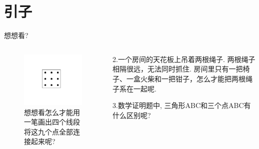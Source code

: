 \documentclass[UTF8, aspectratio=169, 10pt, t]{ctexbeamer}
\begin{document}
\section*{引子}

\begin{frame}{想想看?}
	\begin{columns}[c]
		\begin{column}{0.5\textwidth}
			\begin{figure}
				\centering
				\includegraphics[width=0.7\linewidth]{i1}
				\caption{想想看怎么才能用一笔画出四个线段将这九个点全部连接起来呢?}
				\label{fig:i1}
			\end{figure}
			
		\end{column}
		\begin{column}{0.5\textwidth}
			2.一个房间的天花板上吊着两根绳子. 两根绳子相隔很远，无法同时抓住. 房间里只有一把椅子、一盒火柴和一把钳子，怎么才能把两根绳子系在一起呢. 
			
			\vspace{1em}
			
			3.数学证明题中, 三角形ABC和三个点ABC有什么区别呢?
		\end{column}
	\end{columns}
\end{frame}
\end{document}
